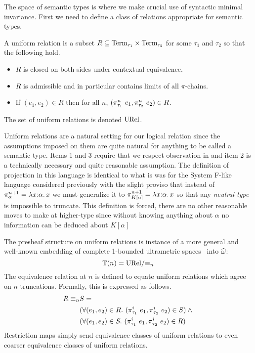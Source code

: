 The space of semantic types is where we make crucial use of syntactic
minimal invariance. First we need to define a class of relations
appropriate for semantic types.
\begin{defn}\label{def:guarded:urel}
  A uniform relation is a subset
  $R \subseteq \mathrm{Term}_{\tau_1} \times \mathrm{Term}_{\tau_2}$ for some $\tau_1$
  and $\tau_2$ so that the following hold.
  \begin{itemize}
  \item $R$ is closed on both sides under contextual equivalence.
  \item $R$ is admissible and in particular contains limits of all
    $\pi$-chains.
  \item If $(e_1, e_2) \in R$ then for all $n$,
    $(\pi_{\tau_1}^n\ e_1, \pi_{\tau_2}^n\ e_2) \in R$.
  \end{itemize}
  The set of uniform relations is denoted $\mathrm{URel}$.
\end{defn}
Uniform relations are a natural setting for our logical relation since
the assumptions imposed on them are quite natural for anything to be
called a semantic type. Items 1 and 3 require that we respect
observation in and item 2 is a technically necessary and quite
reasonable assumption. The definition of projection in this language
is identical to what is was for the System F-like language considered
previously with the slight proviso that instead of
$\pi_{\alpha}^{n + 1} = \lambda x {:} \alpha.\, x$ we must generalize it to
$\pi_{K[\alpha]}^{n + 1} = \lambda x {:} \alpha.\, x$ so that any
\emph{neutral type} is impossible to truncate. This definition is
forced, there are no other reasonable moves to make at higher-type
since without knowing anything about $\alpha$ no information can be
deduced about $K[\alpha]$

The presheaf structure on uniform relations is instance of a more
general and well-known embedding of complete 1-bounded ultrametric
spaces~\citep{TODO-CBULT} into $\widehat{\omega}$:
\[
  \mathbb{T}(n) = \mathrm{URel} / {\equiv_n}
\]
The equivalence relation at $n$ is defined to equate uniform relations
which agree on $n$ truncations. Formally, this is expressed as
follows.
\begin{align*}
  R \equiv_n &S =\\
  &(\forall (e_1, e_2) \in R.\ (\pi^i_{\tau_1}\ e_1, \pi^i_{\tau_2}\ e_2) \in S) \land {}\\
  &(\forall (e_1, e_2) \in S.\ (\pi^i_{\tau_1}\ e_1, \pi^i_{\tau_2}\ e_2) \in R)
\end{align*}
Restriction maps simply send equivalence classes of uniform relations
to even coarser equivalence classes of uniform relations.

